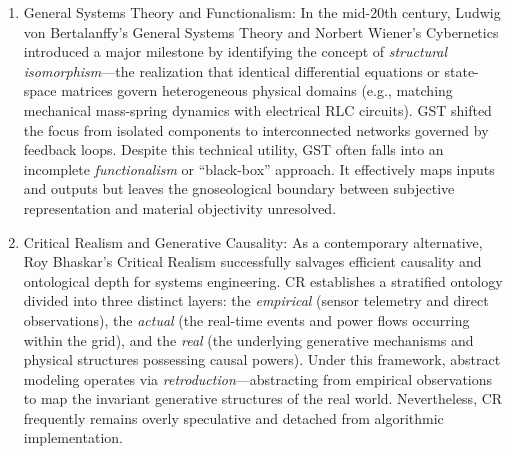 \documentclass[11pt, a4paper]{article}
\begin{document}
\begin{enumerate}
    \item {General Systems Theory and Functionalism:} In the mid-20th century, Ludwig von Bertalanffy's General Systems Theory \cite{vonbertalanffy1968general} and Norbert Wiener's Cybernetics introduced a major milestone by identifying the concept of \textit{structural isomorphism}---the realization that identical differential equations or state-space matrices govern heterogeneous physical domains (e.g., matching mechanical mass-spring dynamics with electrical RLC circuits). GST shifted the focus from isolated components to interconnected networks governed by feedback loops. Despite this technical utility, GST often falls into an incomplete \textit{functionalism} or ``black-box'' approach. It effectively maps inputs and outputs but leaves the gnoseological boundary between subjective representation and material objectivity unresolved.

    \item {Critical Realism and Generative Causality:} As a contemporary alternative, Roy Bhaskar's Critical Realism \cite{bhaskar1975realist} successfully salvages efficient causality and ontological depth for systems engineering. CR establishes a stratified ontology divided into three distinct layers: the \textit{empirical} (sensor telemetry and direct observations), the \textit{actual} (the real-time events and power flows occurring within the grid), and the \textit{real} (the underlying generative mechanisms and physical structures possessing causal powers). Under this framework, abstract modeling operates via \textit{retroduction}—abstracting from empirical observations to map the invariant generative structures of the real world. Nevertheless, CR frequently remains overly speculative and detached from algorithmic implementation.


\end{enumerate}
\end{document}
